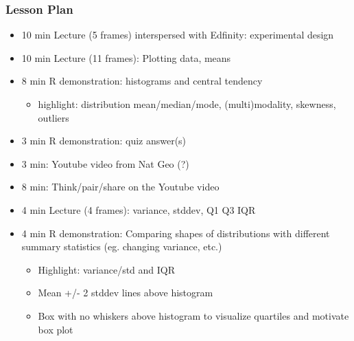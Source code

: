\begin{frame}
    \frametitle{Lesson Plan}
    \begin{itemize}
        \item 10 min Lecture (5 frames) interspersed with Edfinity: experimental design
        \item 10 min Lecture (11 frames): Plotting data, means
        \item 8 min R demonstration: histograms and central tendency
        \begin{itemize}
            \item  highlight: distribution mean/median/mode, (multi)modality, skewness, outliers
        \end{itemize}
        \item 3 min R demonstration: quiz answer(s)
        \item 3 min: Youtube video from Nat Geo (?)
        \item 8 min: Think/pair/share on the Youtube video
        \item 4 min Lecture (4 frames): variance, stddev, Q1 Q3 IQR
        \item 4 min R demonstration: Comparing shapes of distributions with different summary statistics (eg. changing variance, etc.)
        \begin{itemize}
            \item Highlight: variance/std and IQR
            \item Mean +/- 2 stddev lines above histogram
            \item Box with no whiskers above histogram to visualize quartiles and motivate box plot
         \end{itemize}
     \end{itemize}
\end{frame}

